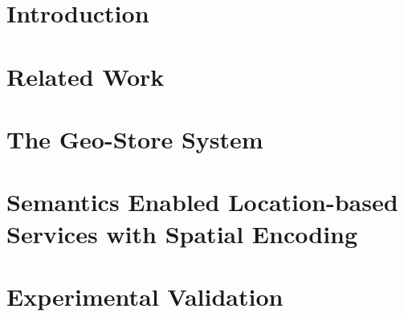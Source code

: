
%

\section{Introduction}\label{sec-intro}


\section{Related Work}\label{sec-relwork}


\section{The Geo-Store System}\label{sec-design}


\section{Semantics Enabled Location-based Services with Spatial Encoding}\label{sec-query}


\section{Experimental Validation}\label{sec-experiment}


%
